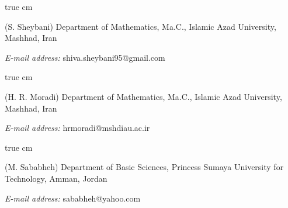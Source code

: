 \documentclass[12pt,twoside,reqno]{amsart}
\numberwithin{equation}{section}
\begin{document}
 true cm 	

{\tiny (S. Sheybani) Department of Mathematics, Ma.C., Islamic Azad University, Mashhad, Iran 
	
\textit{E-mail address:} shiva.sheybani95@gmail.com}


 true cm 	

{\tiny (H. R. Moradi) Department of Mathematics, Ma.C., Islamic Azad University, Mashhad, Iran 
	
\textit{E-mail address:} hrmoradi@mshdiau.ac.ir}

 true cm 	

{\tiny (M. Sababheh) Department of Basic Sciences, Princess Sumaya University for Technology, Amman, Jordan
	
\textit{E-mail address:} sababheh@yahoo.com}




\end{document}
